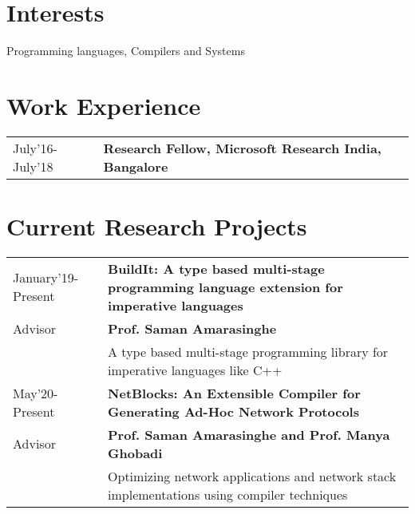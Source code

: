 \documentclass[10pt]{article}
\newcommand \VRule{}
\begin{document}
\section*{Interests}
Programming languages, Compilers and Systems


\section*{Work Experience}
\begin{tabular}{l!{\VRule}l}
July'16-July'18 & {\bf Research Fellow, Microsoft Research India, Bangalore } \\
\end{tabular}

\section*{Current Research Projects}
\begin{longtable}{l!{\VRule} p{15cm} }

January'19-Present & {\bf BuildIt: A type based multi-stage programming language extension for imperative languages} \\
Advisor       & {\bf Prof. Saman Amarasinghe} \\
 & A type based multi-stage programming library for imperative languages like C++ \newline \\

May'20-Present & {\bf NetBlocks: An Extensible Compiler for Generating Ad-Hoc Network Protocols } \\
Advisor & {\bf Prof. Saman Amarasinghe and Prof. Manya Ghobadi} \\
 & Optimizing network applications and network stack implementations using compiler techniques \newline \\

\end{longtable}
\end{document}
